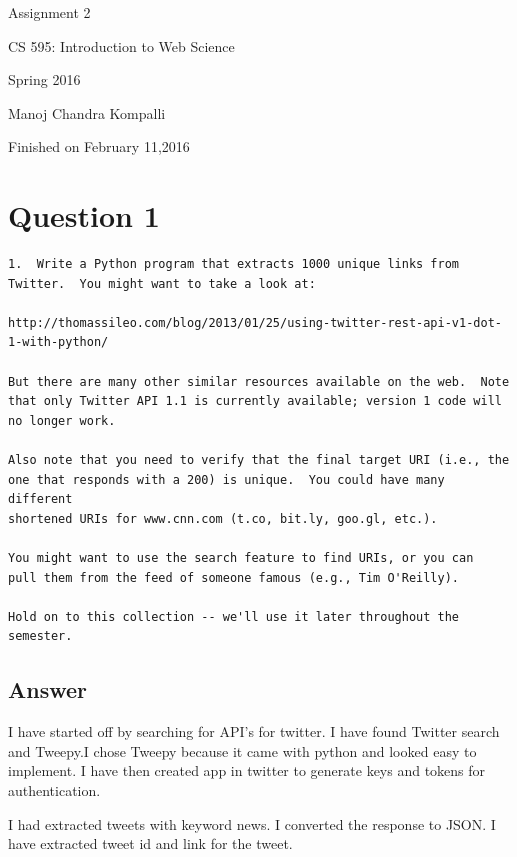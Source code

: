\documentclass[letterpaper,11pt]{article}
\begin{document}
\begin{titlepage}

\begin{center}

\Huge{Assignment 2}

\Large{CS 595:  Introduction to Web Science}

\Large{Spring 2016}

\Large{Manoj Chandra Kompalli}

\Large Finished on February 11,2016

\end{center}

\end{titlepage}
\tableofcontents
\newpage




\section{Question 1}
\label{part1}
\begin{verbatim}
1.  Write a Python program that extracts 1000 unique links from
Twitter.  You might want to take a look at:

http://thomassileo.com/blog/2013/01/25/using-twitter-rest-api-v1-dot-1-with-python/

But there are many other similar resources available on the web.  Note
that only Twitter API 1.1 is currently available; version 1 code will
no longer work.

Also note that you need to verify that the final target URI (i.e., the
one that responds with a 200) is unique.  You could have many different
shortened URIs for www.cnn.com (t.co, bit.ly, goo.gl, etc.).

You might want to use the search feature to find URIs, or you can
pull them from the feed of someone famous (e.g., Tim O'Reilly).

Hold on to this collection -- we'll use it later throughout the semester.
\end{verbatim}
\newpage
\subsection{Answer}
I have started off by searching for API’s for twitter. I have found  Twitter search and Tweepy.I chose Tweepy because it came with python and looked easy to implement. 
 I have then created app in twitter to generate keys and tokens for authentication.

I had extracted tweets with keyword news. I converted the response to JSON. I have extracted tweet id and link for the tweet. 
\end{document}
